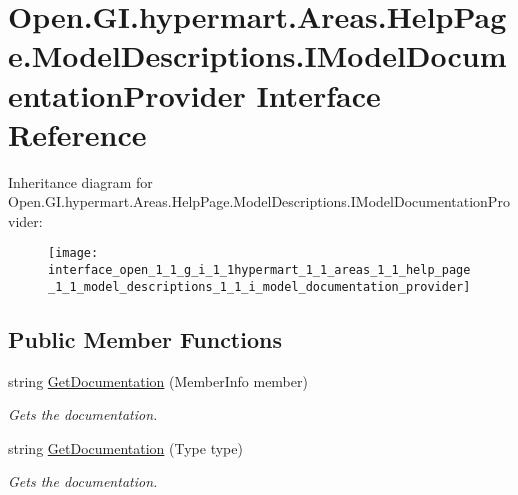 \hypertarget{interface_open_1_1_g_i_1_1hypermart_1_1_areas_1_1_help_page_1_1_model_descriptions_1_1_i_model_documentation_provider}{}\section{Open.\+G\+I.\+hypermart.\+Areas.\+Help\+Page.\+Model\+Descriptions.\+I\+Model\+Documentation\+Provider Interface Reference}
\label{interface_open_1_1_g_i_1_1hypermart_1_1_areas_1_1_help_page_1_1_model_descriptions_1_1_i_model_documentation_provider}


 


Inheritance diagram for Open.\+G\+I.\+hypermart.\+Areas.\+Help\+Page.\+Model\+Descriptions.\+I\+Model\+Documentation\+Provider\+:\begin{figure}[H]
\begin{center}
\leavevmode
\texttt{[image: interface\_open\_1\_1\_g\_i\_1\_1hypermart\_1\_1\_areas\_1\_1\_help\_page\_1\_1\_model\_descriptions\_1\_1\_i\_model\_documentation\_provider]}
\end{center}
\end{figure}
\subsection*{Public Member Functions}
\begin{DoxyCompactItemize}
\item 
string \hyperlink{interface_open_1_1_g_i_1_1hypermart_1_1_areas_1_1_help_page_1_1_model_descriptions_1_1_i_model_documentation_provider_a27d4470da05e52051ae345515c17755a}{Get\+Documentation} (Member\+Info member)
\begin{DoxyCompactList}\small\item\em Gets the documentation. \end{DoxyCompactList}\item 
string \hyperlink{interface_open_1_1_g_i_1_1hypermart_1_1_areas_1_1_help_page_1_1_model_descriptions_1_1_i_model_documentation_provider_a047061b90c62930fc0a1dbcb09732bd3}{Get\+Documentation} (Type type)
\begin{DoxyCompactList}\small\item\em Gets the documentation. \end{DoxyCompactList}\end{DoxyCompactItemize}



